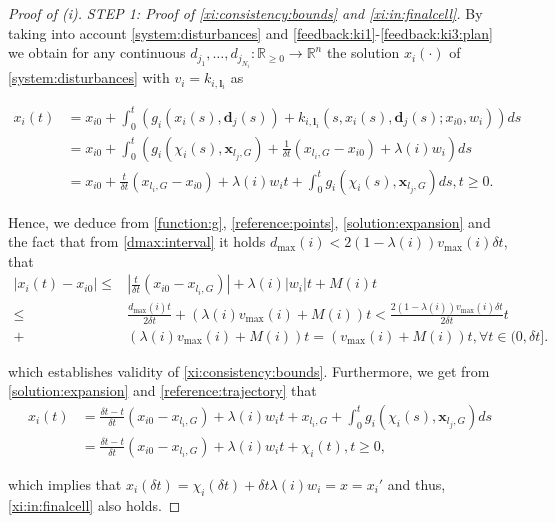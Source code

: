 \documentclass[reqno]{amsart}
\theoremstyle{plain}
\theoremstyle{definition}
\numberwithin{equation}{section}
\begin{document}
\begin{proof}[Proof of (i)]
\noindent \textit{STEP 1:  Proof of \eqref{xi:consistency:bounds} and \eqref{xi:in:finalcell}.} By taking into account \eqref{system:disturbances} and \eqref{feedback:ki1}-\eqref{feedback:ki3:plan} we obtain for any continuous $d_{j_1},\ldots,d_{j_{N_i}}:{\ensuremath{\mathbb{R}_{ \geq 0}}}\to{\ensuremath{\mathbb{R}^{{n}}}}$ the solution $x_i(\cdot)$ of \eqref{system:disturbances} with $v_i=k_{i,{\textbf{{l}}}_i}$ as

\begin{align}
x_i(t) & =x_{i0}+\int_0^t(g_i(x_i(s),{\textbf{{d}}}_j(s))+k_{i,{\textbf{{l}}}_i}(s,x_{i}(s),{\textbf{{d}}}_j(s);x_{i0},w_i))ds  \nonumber \\
& = x_{i0}+\int_0^t\left(g_i(\chi_i(s),{\textbf{{x}}}_{l_j,G})+\frac{1}{\delta t}(x_{l_i,G}-x_{i0})+\lambda(i) w_i\right)ds  \nonumber \\
& = x_{i0}+ \frac{t}{\delta t}(x_{l_i,G}-x_{i0})+\lambda(i) w_it+\int_0^tg_i(\chi_i(s),{\textbf{{x}}}_{l_j,G})ds,t\ge 0. \label{solution:expansion}
\end{align}

\noindent Hence, we deduce from \eqref{function:g}, \eqref{reference:points}, \eqref{solution:expansion} and the fact that from \eqref{dmax:interval} it holds $d_{\max}(i)< 2(1-\lambda(i))v_{\max}(i)\delta t$, that
\begin{align} \label{solution:vs:reftraj}
|x_i(t)-x_{i0}| \le & \left|\frac{t}{\delta t}(x_{i0}-x_{l_i,G})\right|+\lambda(i)|w_i|t+M(i)t \nonumber \\
\le & \frac{d_{\max}(i)t}{2\delta t}+(\lambda(i)v_{\max}(i)+M(i))t < \frac{2(1-\lambda(i))v_{\max}(i)\delta t}{2\delta t}t \nonumber \\
+ & (\lambda(i)v_{\max}(i)+M(i))t=(v_{\max}(i)+M(i))t,\forall t\in (0,\delta t].
\end{align}

\noindent which establishes validity of \eqref{xi:consistency:bounds}. Furthermore, we get from \eqref{solution:expansion} and \eqref{reference:trajectory} that 
\begin{align}
x_i(t) & = \frac{\delta t-t}{\delta t}(x_{i0}-x_{l_i,G})+\lambda(i)w_it+x_{l_i,G}+\int_0^tg_i(\chi_i(s),{\textbf{{x}}}_{l_j,G})ds \nonumber \\
& = \frac{\delta t-t}{\delta t}(x_{i0}-x_{l_i,G})+\lambda(i)w_it+\chi_i(t),t\ge 0, \label{solution:expression}
\end{align}

\noindent which implies that $x_i(\delta t)=\chi_i(\delta t)+\delta t\lambda(i) w_i=x=x_i'$ and thus, \eqref{xi:in:finalcell} also holds. 


\end{proof}
\end{document}
